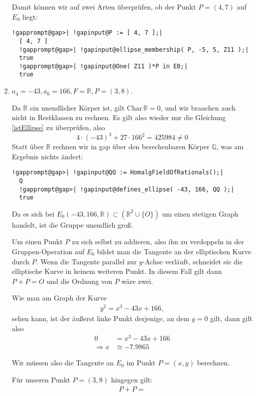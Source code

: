 \begin{enumerate}[label=\alph*)]
Damit können wir auf zwei Arten überprüfen, ob der Punkt $P = (4, 7)$ auf $E_{0}$ liegt:

\begin{Verbatim}[commandchars=!@|,fontsize=\small,frame=single,label=Example]
  !gapprompt@gap>| !gapinput@P := [ 4, 7 ];|
  [ 4, 7 ]
  !gapprompt@gap>| !gapinput@ellipse_membership( P, -5, 5, Z11 );|
  true
  !gapprompt@gap>| !gapinput@One( Z11 )*P in E0;|
  true
\end{Verbatim}

\item $a_{4} = -43, a_{6} = 166, F = \mathbb{R}, P = (3, 8)$.

Da $\mathbb{R}$ ein unendlicher Körper ist, gilt $\mathrm{Char}\,\mathbb{R} = 0$, und wir brauchen auch nicht in Restklassen zu rechnen.
Es gilt also wieder nur die Gleichung \eqref{istEllipse} zu überprüfen, also
\[
4\cdot (-43)^{3} + 27\cdot 166^{2} = 425984 \neq 0
\]
Statt über $\mathbb{R}$ rechnen wir in gap über den berechenbaren Körper $\mathbb{Q}$, was am Ergebnis nichts ändert:

\begin{Verbatim}[commandchars=!@|,fontsize=\small,frame=single,label=Example]
  !gapprompt@gap>| !gapinput@QQ := HomalgFieldOfRationals();|
  Q
  !gapprompt@gap>| !gapinput@defines_ellipse( -43, 166, QQ );|
  true
\end{Verbatim}

Da es sich bei $E_{0}( -43, 166, \mathbb{R}) \subset (\mathbb{R}^{2} \cup \{O\})$ um einen stetigen Graph handelt, ist die Gruppe
unendlich groß.

Um einen Punkt $P$ zu sich selbst zu addieren, also ihn zu verdoppeln in der Gruppen-Operation auf $E_{0}$ bildet man die Tangente an der
elliptischen Kurve durch $P$. Wenn die Tangente parallel zur $y$-Achse verläuft, schneidet sie die elliptische Kurve in keinem weiteren Punkt.
In diesem Fall gilt dann $P + P = O$ und die Ordnung von $P$ wäre zwei.

Wie man am Graph der Kurve
\begin{align*}
y^2 = x^{3} - 43x + 166,
\end{align*}
sehen kann, ist der äußerst linke Punkt derjenige, an dem $y = 0$ gilt, dann gilt also
\begin{align*}
0 &= x^{3} - 43x + 166 \\
\Rightarrow x &\cong -7.9865
\end{align*}

Wir müssen also die Tangente an $E_{0}$ im Punkt $P = (x, y)$ berechnen.

Für unseren Punkt $P = (3, 8)$ hingegen gilt:
\begin{align*}
P + P = 
\end{align*}

\end{enumerate}























